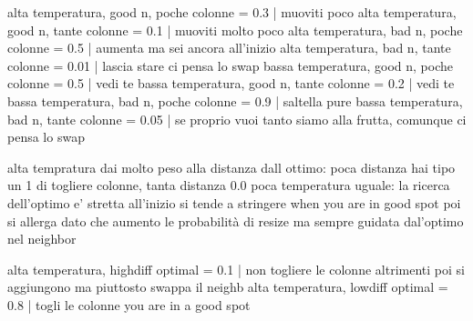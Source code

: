 \documentclass[11pt]{article}
\begin{document}
    alta temperatura, good n, poche colonne = 0.3        | muoviti poco
    alta temperatura, good n, tante colonne = 0.1        | muoviti molto poco
    alta temperatura, bad n, poche colonne = 0.5         | aumenta ma sei ancora all'inizio
    alta temperatura, bad n, tante colonne = 0.01        | lascia stare ci pensa lo swap
    bassa temperatura, good n, poche colonne = 0.5       | vedi te
    bassa temperatura, good n, tante colonne = 0.2       | vedi te
    bassa temperatura, bad n, poche colonne = 0.9        | saltella pure 
    bassa temperatura, bad n, tante colonne = 0.05       | se proprio vuoi tanto siamo alla frutta, comunque ci pensa lo swap

    
    alta tempratura dai molto peso alla distanza dall ottimo: poca distanza hai tipo un 1 di togliere colonne, tanta distanza 0.0
    poca temperatura uguale: la ricerca dell'optimo e' stretta all'inizio si tende a stringere when you are in good spot
                                                    poi si allerga dato che aumento le probabilità di resize ma sempre guidata dal'optimo nel neighbor

    alta temperatura, highdiff optimal = 0.1             | non togliere le colonne altrimenti poi si aggiungono ma piuttosto swappa il neighb
    alta temperatura, lowdiff optimal = 0.8              | togli le colonne you are in a good spot
\end{document}
